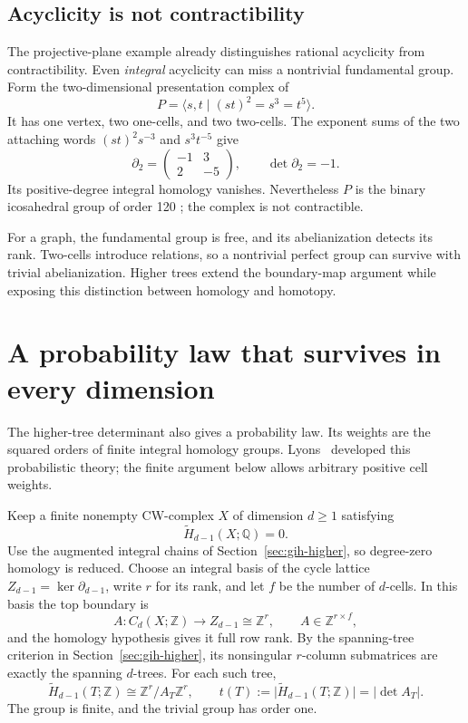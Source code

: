 \documentclass[11pt]{article}
\theoremstyle{definition}
\theoremstyle{remark}
\newcommand{\Q}{\mathbb Q}
\newcommand{\Z}{\mathbb Z}
\newcommand{\R}{\mathbb R}
\newcommand{\C}{\mathbb C}
\begin{document}
\subsection{Acyclicity is not contractibility}

The projective-plane example already distinguishes rational acyclicity
from contractibility.  Even \emph{integral} acyclicity can miss a
nontrivial fundamental group.  Form the two-dimensional presentation
complex of
\[
 P=\langle s,t\mid(st)^2=s^3=t^5\rangle.
\]
It has one vertex, two one-cells, and two two-cells.  The exponent sums
of the two attaching words \((st)^2s^{-3}\) and \(s^3t^{-5}\) give
\[
 \partial_2=
 \begin{pmatrix}-1&3\\2&-5\end{pmatrix},
 \qquad \det\partial_2=-1.
\]
Its positive-degree integral homology vanishes.  Nevertheless \(P\)
is the binary icosahedral group of order 120
\cite{gih-brini-icosahedral}; the complex is not contractible.

For a graph, the fundamental group is free, and its abelianization
detects its rank. Two-cells introduce relations, so a nontrivial perfect
group can survive with trivial abelianization. Higher trees extend the
boundary-map argument while exposing this distinction between homology
and homotopy.

\section{A probability law that survives in every dimension}
\label{hte-section}

The higher-tree determinant also gives a probability law. Its weights are
the squared orders of finite integral homology groups.
Lyons~\cite{hte-lyons-determinantal,hte-lyons-complexes} developed this
probabilistic theory; the finite argument below allows arbitrary positive cell weights.

Keep a finite nonempty CW-complex $X$ of dimension $d\geq1$ satisfying
\[
\widetilde H_{d-1}(X;\Q)=0.
\]
Use the augmented integral chains of Section~\ref{sec:gih-higher}, so
degree-zero homology is reduced. Choose an integral basis of the cycle
lattice $Z_{d-1}=\ker\partial_{d-1}$, write $r$ for its rank, and let $f$
be the number of $d$-cells. In this basis the top boundary is
\[
A:C_d(X;\Z)\longrightarrow Z_{d-1}\cong\Z^r,
\qquad A\in\Z^{r\times f},
\]
and the homology hypothesis gives it full row rank. By the spanning-tree
criterion in Section~\ref{sec:gih-higher}, its nonsingular $r$-column
submatrices are exactly the spanning $d$-trees. For each such tree,
\begin{equation}
\label{hte-torsion-index}
\widetilde H_{d-1}(T;\Z)\cong\Z^r/A_T\Z^r,
\qquad
t(T):=\bigl|\widetilde H_{d-1}(T;\Z)\bigr|=|\det A_T|.
\end{equation}
The group is finite, and the trivial group has order one.
\end{document}
